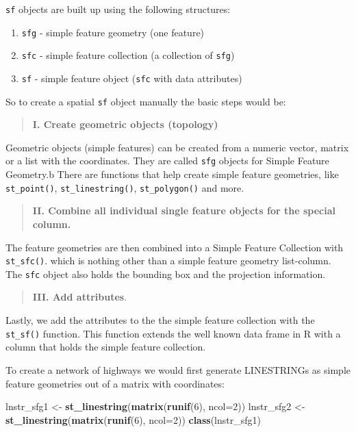 \documentclass[
]{book}
\newenvironment{Shaded}{\begin{snugshade}}{\end{snugshade}}
\newcommand{\AttributeTok}[1]{\textcolor[rgb]{0.13,0.29,0.53}{#1}}
\newcommand{\DecValTok}[1]{\textcolor[rgb]{0.00,0.00,0.81}{#1}}
\newcommand{\FunctionTok}[1]{\textcolor[rgb]{0.13,0.29,0.53}{\textbf{#1}}}
\newcommand{\NormalTok}[1]{#1}
\newcommand{\OtherTok}[1]{\textcolor[rgb]{0.56,0.35,0.01}{#1}}
\providecommand{\tightlist}{%
  \setlength{\itemsep}{0pt}\setlength{\parskip}{0pt}}
\begin{document}
\texttt{sf} objects are built up using the following structures:

\begin{enumerate}
\def\labelenumi{\arabic{enumi}.}
\tightlist
\item
  \texttt{sfg} - simple feature geometry (one feature)
\item
  \texttt{sfc} - simple feature collection (a collection of \texttt{sfg})
\item
  \texttt{sf} - simple feature object (\texttt{sfc} with data attributes)
\end{enumerate}

So to create a spatial \texttt{sf} object manually the basic steps would be:

\begin{quote}
\textbf{I. Create geometric objects (topology)}
\end{quote}

Geometric objects (simple features) can be created from a numeric vector, matrix or a list with the coordinates. They are called \texttt{sfg} objects for Simple Feature Geometry.b There are functions that help create simple feature geometries, like \texttt{st\_point()}, \texttt{st\_linestring()}, \texttt{st\_polygon()} and more.

\begin{quote}
\textbf{II. Combine all individual single feature objects for the special column.}
\end{quote}

The feature geometries are then combined into a Simple Feature Collection with \texttt{st\_sfc()}. which is nothing other than a simple feature geometry list-column. The \texttt{sfc} object also holds the bounding box and the projection information.

\begin{quote}
\textbf{III. Add attributes}.
\end{quote}

Lastly, we add the attributes to the the simple feature collection with the \texttt{st\_sf()} function. This function extends the well known data frame in R with a column that holds the simple feature collection.

To create a network of highways we would first generate LINESTRINGs as simple feature geometries out of a matrix with coordinates:

\begin{Shaded}
\begin{Highlighting}[]
\NormalTok{lnstr\_sfg1 }\OtherTok{\textless{}{-}} \FunctionTok{st\_linestring}\NormalTok{(}\FunctionTok{matrix}\NormalTok{(}\FunctionTok{runif}\NormalTok{(}\DecValTok{6}\NormalTok{), }\AttributeTok{ncol=}\DecValTok{2}\NormalTok{)) }
\NormalTok{lnstr\_sfg2 }\OtherTok{\textless{}{-}} \FunctionTok{st\_linestring}\NormalTok{(}\FunctionTok{matrix}\NormalTok{(}\FunctionTok{runif}\NormalTok{(}\DecValTok{6}\NormalTok{), }\AttributeTok{ncol=}\DecValTok{2}\NormalTok{)) }
\FunctionTok{class}\NormalTok{(lnstr\_sfg1)}
\end{Highlighting}
\end{Shaded}
\end{document}
